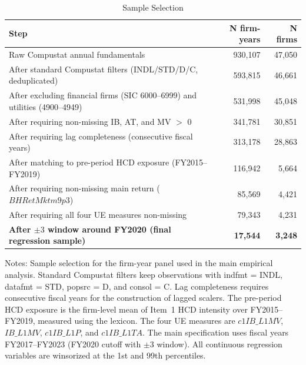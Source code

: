 \documentclass[12pt]{article}
\begin{document}
\begin{table}[ht]
\centering
\caption{Sample Selection}
\label{tab:sample}
\small
\begin{threeparttable}
\begin{tabular}{lrr}
\toprule
\textbf{Step} & \textbf{N firm-years} & \textbf{N firms} \\
\midrule
Raw Compustat annual fundamentals & 930,107 & 47,050 \\
After standard Compustat filters (INDL/STD/D/C, deduplicated) & 593,815 & 46,661 \\
After excluding financial firms (SIC 6000--6999) and utilities (4900--4949) & 531,998 & 45,048 \\
After requiring non-missing IB, AT, and MV $>$ 0 & 341,781 & 30,851 \\
After requiring lag completeness (consecutive fiscal years) & 313,178 & 28,863 \\
After matching to pre-period HCD exposure (FY2015--FY2019) & 116,942 & 5,664 \\
After requiring non-missing main return ($BHRetMktm9p3$) & 85,569 & 4,421 \\
After requiring all four UE measures non-missing & 79,343 & 4,231 \\
\textbf{After $\pm 3$ window around FY2020 (final regression sample)} & \textbf{17,544} & \textbf{3,248} \\
\bottomrule
\end{tabular}
\begin{tablenotes}
\footnotesize
\item Notes: Sample selection for the firm-year panel used in the main empirical analysis. Standard Compustat filters keep observations with indfmt = INDL, datafmt = STD, popsrc = D, and consol = C. Lag completeness requires consecutive fiscal years for the construction of lagged scalers. The pre-period HCD exposure is the firm-level mean of Item~1 HCD intensity over FY2015--FY2019, measured using the \citet{demers_al2024} lexicon. The four UE measures are $c1IB\_L1MV$, $IB\_L1MV$, $c1IB\_L1P$, and $c1IB\_L1TA$. The main specification uses fiscal years FY2017--FY2023 (FY2020 cutoff with $\pm 3$ window). All continuous regression variables are winsorized at the 1st and 99th percentiles.
\end{tablenotes}
\end{threeparttable}
\end{table}

\clearpage
\end{document}
